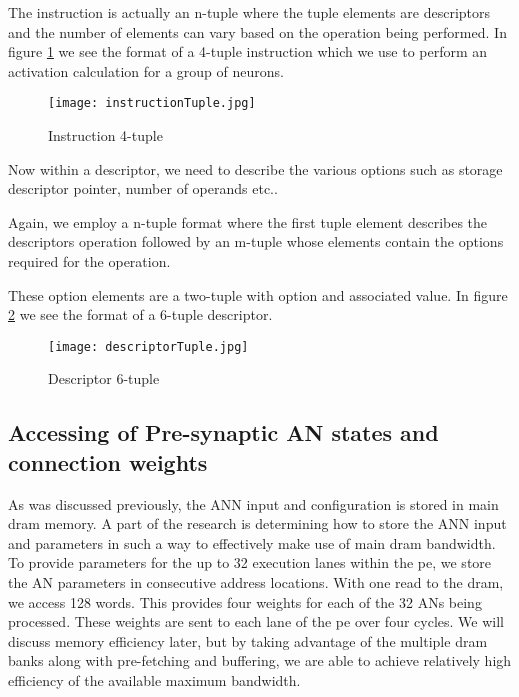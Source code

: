 The instruction is actually an n-tuple where the tuple elements are descriptors and the number of elements can vary based on the operation being performed. In figure \ref{fig:instructionTuple} we see the format of a 4-tuple instruction which we use to perform an activation calculation for a group of neurons.

\begin{figure}[!t]
\centering
\captionsetup{justification=centering}
\captionsetup{width=.9\linewidth}
\centerline{
\mbox{\texttt{[image: instructionTuple.jpg]}}
}
\caption{Instruction 4-tuple}
\label{fig:instructionTuple}
\end{figure}

Now within a descriptor, we need to describe the various options such as storage descriptor pointer, number of operands etc..

Again, we employ a n-tuple format where the first tuple element describes the descriptors operation followed by an m-tuple whose elements contain the options required for the operation.

These option elements are a two-tuple with option and associated value.
In figure \ref{fig:descriptorTuple} we see the format of a 6-tuple descriptor.

\begin{figure}[!t]
\centering
\captionsetup{justification=centering}
\captionsetup{width=.9\linewidth}
\centerline{
\mbox{\texttt{[image: descriptorTuple.jpg]}}
}
\caption{Descriptor 6-tuple}
\label{fig:descriptorTuple}
\end{figure}



\subsection{Accessing of Pre-synaptic AN states and connection weights}
\label{sec:AccessingANStates}

As was discussed previously, the ANN input and configuration is stored in main \ac{dram} memory. A part of the research is determining how to store the ANN input and parameters in such a way to effectively make use of main \ac{dram} bandwidth. To provide parameters for the up to 32 execution lanes within the \ac{pe}, we store the AN parameters in consecutive address locations. With one read to the \ac{dram}, we access 128 words. This provides four weights for each of the 32 ANs being processed. These weights are sent to each lane of the \ac{pe} over four cycles. We will discuss memory efficiency later, but by taking advantage of the multiple \ac{dram} banks along with pre-fetching and buffering, we are able to achieve relatively high efficiency of the available maximum bandwidth.

